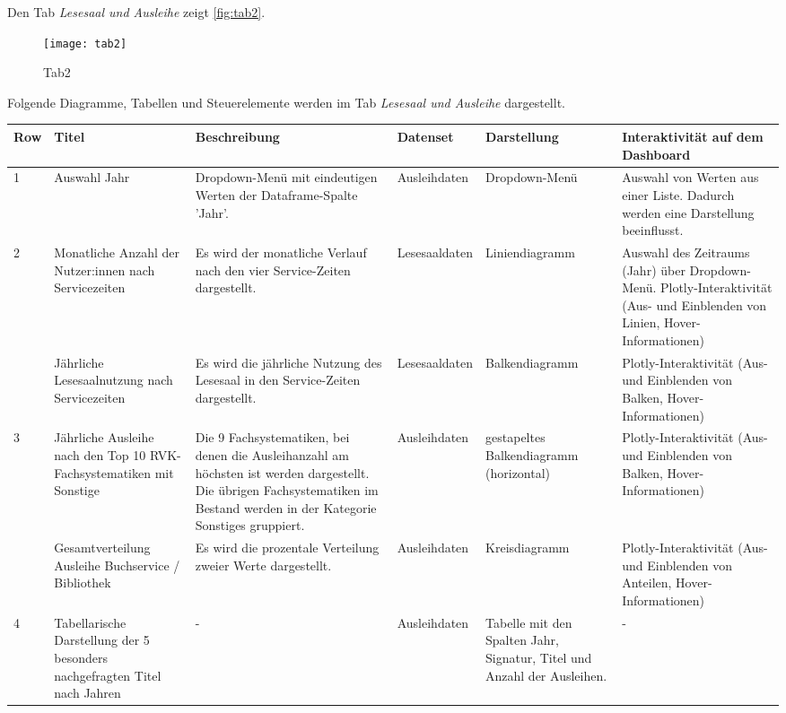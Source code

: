 Den Tab \textit{Lesesaal und Ausleihe} zeigt \autoref{fig:tab2}.

    \begin{figure}[H]
        \centering
            \texttt{[image: tab2]}
            \caption{Tab2}
            \label{fig:tab2}
    \end{figure}
    
\clearpage
Folgende Diagramme, Tabellen und Steuerelemente werden im Tab \textit{Lesesaal und Ausleihe} dargestellt.


    \begingroup
    \setlength{\tabcolsep}{12pt} %
    \renewcommand{\arraystretch}{1.5} 
    \begin{table}[H]
        \centering
        \begin{adjustbox}{max width=\textwidth}
        \begin{tabular}{p{}p{}p{}p{}p{}p{}}
           \toprule
           Row        &Titel &Beschreibung &Datenset &Darstellung &Interaktivität auf dem Dashboard\\
           \midrule
            1           &Auswahl  Jahr &Dropdown-Menü mit eindeutigen Werten der Dataframe-Spalte 'Jahr'.&Ausleihdaten&Dropdown-Menü &Auswahl von Werten aus einer Liste. Dadurch werden eine Darstellung beeinflusst.\\
           \midrule
            2           &Monatliche Anzahl der Nutzer:innen nach Servicezeiten&Es wird der monatliche Verlauf nach den vier Service-Zeiten dargestellt.&Lesesaaldaten&Liniendiagramm&Auswahl des Zeitraums (Jahr) über Dropdown-Menü. Plotly-Interaktivität (Aus- und Einblenden von Linien, Hover-Informationen)\\
                        &Jährliche Lesesaalnutzung nach Servicezeiten&Es wird die jährliche Nutzung des Lesesaal in den Service-Zeiten dargestellt.&Lesesaaldaten&Balkendiagramm    &Plotly-Interaktivität (Aus- und Einblenden von Balken, Hover-Informationen)\\          
            \midrule
            3           &Jährliche Ausleihe nach den Top 10 RVK-Fachsystematiken mit Sonstige&Die 9 Fachsystematiken, bei denen die Ausleihanzahl am höchsten ist werden dargestellt. Die übrigen Fachsystematiken im Bestand werden in der Kategorie Sonstiges gruppiert.&Ausleihdaten&gestapeltes Balkendiagramm (horizontal)&Plotly-Interaktivität (Aus- und Einblenden von Balken, Hover-Informationen)\\
                        &Gesamtverteilung Ausleihe Buchservice / Bibliothek&Es wird die prozentale Verteilung zweier Werte dargestellt.&Ausleihdaten    &Kreisdiagramm   &Plotly-Interaktivität (Aus- und Einblenden von Anteilen, Hover-Informationen)\\
            \midrule
            4           &Tabellarische Darstellung der 5 besonders nachgefragten Titel nach Jahren&-&Ausleihdaten    &Tabelle mit den Spalten Jahr, Signatur, Titel und Anzahl der Ausleihen.&-\\


\end{tabular}
\end{adjustbox}
\end{table}
